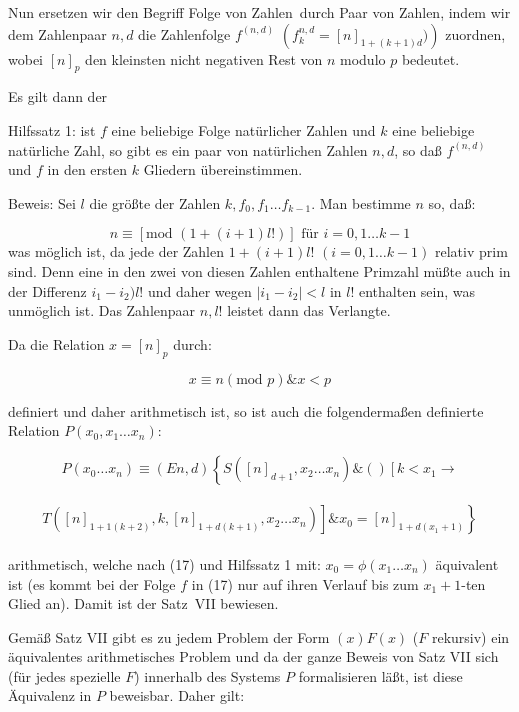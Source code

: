 \documentclass[draft]{scrartcl}
\begin{document}
Nun ersetzen wir den Begriff \glqq Folge von Zahlen\grqq\ durch
\glqq Paar von Zahlen\grqq, indem wir dem Zahlenpaar $n, d$
die Zahlenfolge $f^{\left(n, d\right)}$ $\left(f_k^{n, d} = \left[n\right]_{1 + \left(k + 1\right) d})\right)$
zuordnen, wobei $\left[n\right]_p$ den kleinsten nicht negativen Rest von $n$ modulo $p$ bedeutet.

Es gilt dann der

Hilfssatz 1: ist $f$ eine beliebige Folge natürlicher
Zahlen und $k$ eine beliebige natürliche Zahl, so gibt es
ein paar von natürlichen Zahlen $n, d$, so daß $f^{\left(n, d\right)}$
und $f$ in den ersten $k$ Gliedern übereinstimmen.

Beweis: Sei $l$ die größte der Zahlen $k, f_0, f_1 \dots f_{k - 1}$. Man bestimme $n$ so, daß:

$$
n \equiv \left[\text{mod }\left(1 + \left(i + 1\right) l!\right)\right]\text{ für } i = 0, 1 \dots k - 1
		$$
		was möglich ist, da jede der Zahlen $1 + \left(i + 1\right) l!$ $\left(i = 0, 1 \dots k - 1\right)$
		relativ prim sind. Denn eine in den zwei von diesen Zahlen enthaltene Primzahl
		müßte auch in der Differenz $i_1 - i_2)l!$ und daher wegen
$\left|i_1 - i_2\right| < l$ in $l!$ enthalten sein, was unmöglich
ist. Das Zahlenpaar $n, l!$ leistet dann das Verlangte.

Da die Relation $x = \left[n\right]_p$ durch:

$$
x \equiv n \left(\text{mod } p\right) \& x < p
$$

definiert und daher arithmetisch ist, so ist auch die folgendermaßen definierte Relation $P\left(x_0, x_1 \dots x_n\right)$:

$$
P\left(x_0 \dots x_n\right) \equiv \left(En, d\right) \left\{S\left(\left[n\right]_{d + 1}, x_2 \dots x_n\right) \& \left(\right) \left[k < x_1 \longrightarrow\right.\right.
$$\\[\spacebetweenbreakedequations]
$$ \left.\left.T\left(\left[n\right]_{1 + 1 \left(k + 2\right)}, k, \left[n\right]_{1 + d \left(k + 1\right)}, x_2 \dots x_n\right)\right] \& x_0 = \left[n\right]_{1 + d \left(x_1 + 1\right)}\right\}
$$\\[\spaceafterbreakedequation]
arithmetisch, welche nach (17) und Hilfssatz 1 mit:
$x_0 = \phi\left(x_1 \dots x_n\right)$ äquivalent ist (es kommt
		bei der Folge $f$ in (17) nur auf ihren Verlauf
		bis zum $x_1 + 1$-ten Glied an). Damit ist der
Satz~VII bewiesen.

Gemäß Satz VII gibt es zu jedem Problem der Form
$\left(x\right)F\left(x\right)$ ($F$ rekursiv) ein äquivalentes arithmetisches
Problem und da der ganze Beweis von Satz VII sich (für jedes spezielle $F$) innerhalb des Systems $P$ formalisieren läßt, ist diese Äquivalenz in $P$ beweisbar. Daher gilt:
\end{document}
